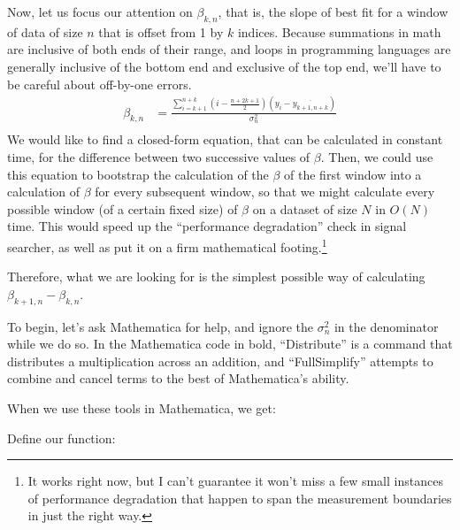\documentclass{article}
\newcommand{\mathsym}[1]{{}}
\newcommand{\unicode}[1]{{}}
\newcounter{mathematicapage}
\begin{document}
Now, let us focus our attention on $\beta_{k,n}$, that is, the slope of best fit for a window of data of size $n$ that is offset from 1 by $k$ indices.  Because summations in math are inclusive of both ends of their range, and loops in programming languages are generally inclusive of the bottom end and exclusive of the top end, we'll have to be careful about off-by-one errors.
\begin{align*}
\beta_{k,n} &= \frac{\sum_{i=k+1}^{n+k}\left(i - \frac{n+2k+1}2\right)\left(y_i-\overline{y_{k+1, n+k}}\right)}{\sigma^2_n} \\
\end{align*}
We would like to find a closed-form equation, that can be calculated in
constant time, for the difference between two successive values of $\beta$.
Then, we could use this equation to bootstrap the calculation of the $\beta$ of
the first window into a calculation of $\beta$ for every subsequent window, so
that we might calculate every possible window (of a certain fixed size) of $\beta$ on a dataset of
size $N$ in $O(N)$ time.  This would speed up the ``performance degradation''
check in signal searcher, as well as put it on a firm mathematical
footing.\footnote{It works right now, but I can't guarantee it won't miss a few
small instances of performance degradation that happen to span the measurement
boundaries in just the right way.}

Therefore, what we are looking for is the simplest possible way of calculating
$\beta_{k+1,n} - \beta_{k,n}$.

To begin, let's ask Mathematica for help, and ignore the $\sigma^2_n$ in the denominator while we do so.  In the Mathematica code in bold, ``Distribute'' is a command that distributes a multiplication across an addition, and ``FullSimplify'' attempts to combine and cancel terms to the best of Mathematica's ability.

When we use these tools in Mathematica, we get:

%
%
%
%
%
Define our function:
\end{document}
